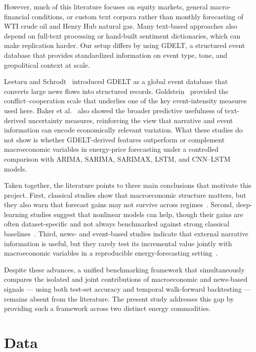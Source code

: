 \documentclass[pdflatex,sn-mathphys-num]{sn-jnl}%
\theoremstyle{thmstyleone}%
\theoremstyle{thmstyletwo}%
\theoremstyle{thmstylethree}%
\begin{document}
However, much of this literature focuses on equity markets, general macro-financial conditions, or custom text corpora rather than monthly forecasting of WTI crude oil and Henry Hub natural gas. Many text-based approaches also depend on full-text processing or hand-built sentiment dictionaries, which can make replication harder. Our setup differs by using GDELT, a structured event database that provides standardized information on event type, tone, and geopolitical context at scale.

Leetaru and Schrodt~\cite{leetaru2013} introduced GDELT as a global event database that converts large news flows into structured records. Goldstein~\cite{goldstein1992} provided the conflict--cooperation scale that underlies one of the key event-intensity measures used here. Baker et al.~\cite{baker2016} also showed the broader predictive usefulness of text-derived uncertainty measures, reinforcing the view that narrative and event information can encode economically relevant variation. What these studies do not show is whether GDELT-derived features outperform or complement macroeconomic variables in energy-price forecasting under a controlled comparison with ARIMA, SARIMA, SARIMAX, LSTM, and CNN--LSTM models.

Taken together, the literature points to three main conclusions that motivate this project. First, classical studies show that macroeconomic structure matters, but they also warn that forecast gains may not survive across regimes~\cite{hamilton2003,kilian2009,baumeister2016}. Second, deep-learning studies suggest that nonlinear models can help, though their gains are often dataset-specific and not always benchmarked against strong classical baselines~\cite{cen2019,busari2021,kim2018}. Third, news- and event-based studies indicate that external narrative information is useful, but they rarely test its incremental value jointly with macroeconomic variables in a reproducible energy-forecasting setting~\cite{tetlock2007,li2014,shapiro2022,leetaru2013}.

Despite these advances, a unified benchmarking framework that simultaneously compares the isolated and joint contributions of macroeconomic and news-based signals --- using both test-set accuracy and temporal walk-forward backtesting --- remains absent from the literature. The present study addresses this gap by providing such a framework across two distinct energy commodities.

\section{Data}\label{secdata}
\end{document}
